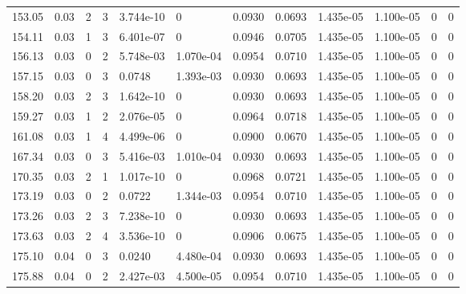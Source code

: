 \documentclass[preview]{standalone}
\begin{document}
{{{\begin{tabular}{L{1.2cm}C{1.2cm} C{0.3cm}C{0.5cm} C{1.4cm}C{1.4cm} C{1.4cm}C{1.4cm} C{1.6cm}C{1.6cm} C{1.6cm}C{1.6cm}}
  153.05  &  0.03  & 2     &  3 &  3.744e-10  & 0  &  0.0930&   0.0693& 1.435e-05 & 1.100e-05   &  0 & 0  \\ 
  154.11  &  0.03  & 1     &  3 &  6.401e-07  & 0  &  0.0946&   0.0705& 1.435e-05 & 1.100e-05   &  0 & 0  \\ 
  156.13  &  0.03  & 0     &  2 &  5.748e-03  & 1.070e-04  &  0.0954&   0.0710& 1.435e-05 & 1.100e-05   &  0 & 0  \\ 
  157.15  &  0.03  & 0     &  3 &  0.0748  & 1.393e-03  &  0.0930&   0.0693& 1.435e-05 & 1.100e-05   &  0 & 0  \\ 
  158.20  &  0.03  & 2     &  3 &  1.642e-10  & 0  &  0.0930&   0.0693& 1.435e-05 & 1.100e-05   &  0 & 0  \\ 
  159.27  &  0.03  & 1     &  2 &  2.076e-05  & 0  &  0.0964&   0.0718& 1.435e-05 & 1.100e-05   &  0 & 0  \\ 
  161.08  &  0.03  & 1     &  4 &  4.499e-06  & 0  &  0.0900&   0.0670& 1.435e-05 & 1.100e-05   &  0 & 0  \\ 
  167.34  &  0.03  & 0     &  3 &  5.416e-03  & 1.010e-04  &  0.0930&   0.0693& 1.435e-05 & 1.100e-05   &  0 & 0  \\ 
  170.35  &  0.03  & 2     &  1 &  1.017e-10  & 0  &  0.0968&   0.0721& 1.435e-05 & 1.100e-05   &  0 & 0  \\ 
  173.19  &  0.03  & 0     &  2 &  0.0722  & 1.344e-03  &  0.0954&   0.0710& 1.435e-05 & 1.100e-05   &  0 & 0  \\ 
  173.26  &  0.03  & 2     &  3 &  7.238e-10  & 0  &  0.0930&   0.0693& 1.435e-05 & 1.100e-05   &  0 & 0  \\ 
  173.63  &  0.03  & 2     &  4 &  3.536e-10  & 0  &  0.0906&   0.0675& 1.435e-05 & 1.100e-05   &  0 & 0  \\ 
  175.10  &  0.04  & 0     &  3 &  0.0240  & 4.480e-04  &  0.0930&   0.0693& 1.435e-05 & 1.100e-05   &  0 & 0  \\ 
  175.88  &  0.04  & 0     &  2 &  2.427e-03  & 4.500e-05  &  0.0954&   0.0710& 1.435e-05 & 1.100e-05   &  0 & 0  \\ 
\hline 
\end{tabular} 

}}}
\end{document}
